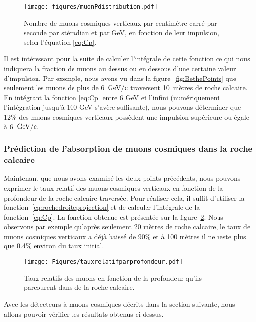 \documentclass[a4paper, 12pt]{article}
\begin{document}
\begin{spacing}{1.5}
\begin{figure}[t]
\begin{center}
\texttt{[image: figures/muonPdistribution.pdf]}
\caption{\label{fig:muonPdistribution} Nombre de muons cosmiques verticaux par centimètre carré par seconde par stéradian et par GeV, en fonction de leur impulsion, selon l'équation \ref{eq:Cp}.}
\end{center}
\end{figure}

Il est intéressant pour la suite de calculer l'intégrale de cette fonction ce qui nous indiquera la fraction de muons au dessus ou en dessous d'une certaine valeur d'impulsion. Par exemple, nous avons vu dans la figure~\ref{fig:BethePoints} que seulement les muons de plus de 6~$\rm{GeV}/c$ traversent 10~mètres de roche calcaire. En intégrant la fonction \ref{eq:Cp} entre 6 GeV et l'infini (numériquement l'intégration jusqu'à 100 GeV s'avère suffisante), nous pouvons déterminer que 12\% des muons cosmiques verticaux possèdent une impulsion supérieure ou égale à 6~$\rm{GeV}/c$.

\subsubsection{Prédiction de l'absorption de muons cosmiques dans la roche calcaire}

Maintenant que nous avons examiné les deux points précédents, nous pouvons exprimer le taux relatif des muons cosmiques verticaux en fonction de la profondeur de la roche calcaire traversée. Pour réaliser cela, il suffit d'utiliser la fonction~\ref{eq:rochedroiteprojection} et de calculer l'intégrale de la fonction~\ref{eq:Cp}. La fonction obtenue est présentée sur la figure~\ref{fig:tauxrelatifparprofondeur}. Nous observons par exemple qu'après seulement 20 mètres de roche calcaire, le taux de muons cosmiques verticaux a déjà baissé de 90\% et à 100 mètres il ne reste plus que 0.4\% environ du taux initial. 

\begin{figure}[t]
\begin{center}
\texttt{[image: Figures/tauxrelatifparprofondeur.pdf]}
\caption{\label{fig:tauxrelatifparprofondeur} Taux relatifs des muons en fonction de la profondeur qu'ils parcourent dans de la roche calcaire.}
\end{center}
\end{figure}

Avec les détecteurs à muons cosmiques décrits dans la section suivante, nous allons pouvoir vérifier les résultats obtenus ci-dessus. 


\end{spacing}
\end{document}
